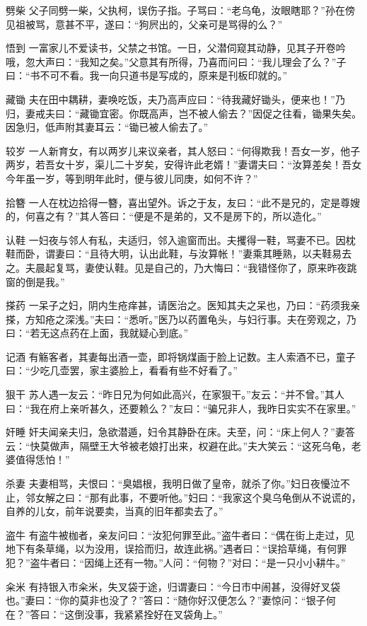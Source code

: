 \documentclass[12pt,UTF8]{ctexbook}
\begin{document}
劈柴
父子同劈一柴，父执柯，误伤子指。子骂曰：“老乌龟，汝眼瞎耶？”孙在傍见祖被骂，意甚不平，遂曰：“狗屄出的，父亲可是骂得的么？”

悟到
一富家儿不爱读书，父禁之书馆。一日，父潜伺窥其动静，见其子开卷吟哦，忽大声曰：“我知之矣。”父意其有所得，乃喜而问曰：“我儿理会了么？”子曰：“书不可不看。我一向只道书是写成的，原来是刊板印就的。”

藏锄
夫在田中耦耕，妻唤吃饭，夫乃高声应曰：“待我藏好锄头，便来也！”乃归，妻戒夫曰：“藏锄宜密。你既高声，岂不被人偷去？”因促之往看，锄果失矣。因急归，低声附其妻耳云：“锄已被人偷去了。”

较岁
一人新育女，有以两岁儿来议亲者，其人怒曰：“何得欺我！吾女一岁，他子两岁，若吾女十岁，渠儿二十岁矣，安得许此老婿！”妻谓夫曰：“汝算差矣！吾女今年虽一岁，等到明年此时，便与彼儿同庚，如何不许？”

拾簪
一人在枕边拾得一簪，喜出望外。诉之于友，友曰：“此不是兄的，定是尊嫂的，何喜之有？”其人答曰：“便是不是弟的，又不是房下的，所以造化。”

认鞋
一妇夜与邻人有私，夫适归，邻入逾窗而出。夫攫得一鞋，骂妻不已。因枕鞋而卧，谓妻曰：“且待大明，认出此鞋，与汝算帐！”妻乘其睡熟，以夫鞋易去之。夫晨起复骂，妻使认鞋。见是自己的，乃大悔曰：“我错怪你了，原来昨夜跳窗的倒是我。”

搽药
一呆子之妇，阴内生疮痒甚，请医治之。医知其夫之呆也，乃曰：“药须我亲搽，方知疮之深浅。”夫曰：“悉听。”医乃以药置龟头，与妇行事。夫在旁观之，乃曰：“若无这点药在上面，我就疑心到底。”

记酒
有觞客者，其妻每出酒一壶，即将锅煤画于脸上记数。主人索酒不已，童子曰：“少吃几壶罢，家主婆脸上，看看有些不好看了。”

狠干
苏人遇一友云：“昨日兄为何如此高兴，在家狠干。”友云：“并不曾。”其人曰：“我在府上亲听甚久，还要赖么？”友曰：“骗兄非人，我昨日实实不在家里。”

奸睡
奸夫闻亲夫归，急欲潜遁，妇令其静卧在床。夫至，问：“床上何人？”妻答云：“快莫做声，隔壁王大爷被老娘打出来，权避在此。”夫大笑云：“这死乌龟，老婆值得恁怕！”

杀妻
夫妻相骂，夫恨曰：“臭娼根，我明日做了皇帝，就杀了你。”妇日夜懮泣不止，邻女解之曰：“那有此事，不要听他。”妇曰：“我家这个臭乌龟倒从不说谎的，自养的儿女，前年说要卖，当真的旧年都卖去了。”

盗牛
有盗牛被枷者，亲友问曰：“汝犯何罪至此。”盗牛者曰：“偶在街上走过，见地下有条草绳，以为没用，误拾而归，故连此祸。”遇者曰：“误拾草绳，有何罪犯？”盗牛者曰：“因绳上还有一物。”人问：“何物？”对曰：“是一只小小耕牛。”

籴米
有持银入市籴米，失叉袋于途，归谓妻曰：“今日市中闹甚，没得好叉袋也。”妻曰：“你的莫非也没了？”答曰：“随你好汉便怎么？”妻惊问：“银子何在？”答曰：“这倒没事，我紧紧拴好在叉袋角上。”
\end{document}
